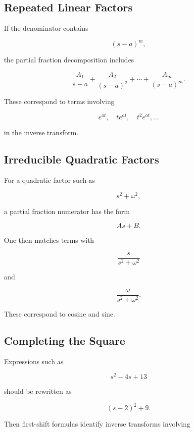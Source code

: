 \subsection{Repeated Linear Factors}
\label{subsec:laplace-repeated-factors}

If the denominator contains

\[
(s-a)^m,
\]

the partial fraction decomposition includes

\[
\boxed{
\frac{A_1}{s-a}
+
\frac{A_2}{(s-a)^2}
+
\cdots
+
\frac{A_m}{(s-a)^m}.
}
\]

These correspond to terms involving

\[
\boxed{
e^{at},
\quad
te^{at},
\quad
t^2e^{at},
\ldots
}
\]

in the inverse transform.

\subsection{Irreducible Quadratic Factors}
\label{subsec:laplace-quadratic-factors}

For a quadratic factor such as

\[
s^2+\omega^2,
\]

a partial fraction numerator has the form

\[
\boxed{
As+B.
}
\]

One then matches terms with

\[
\frac{s}{s^2+\omega^2}
\]

and

\[
\frac{\omega}{s^2+\omega^2}.
\]

These correspond to cosine and sine.

\subsection{Completing the Square}
\label{subsec:laplace-completing-square}

Expressions such as

\[
s^2-4s+13
\]

should be rewritten as

\[
\boxed{
(s-2)^2+9.
}
\]

Then first-shift formulas identify inverse transforms involving

